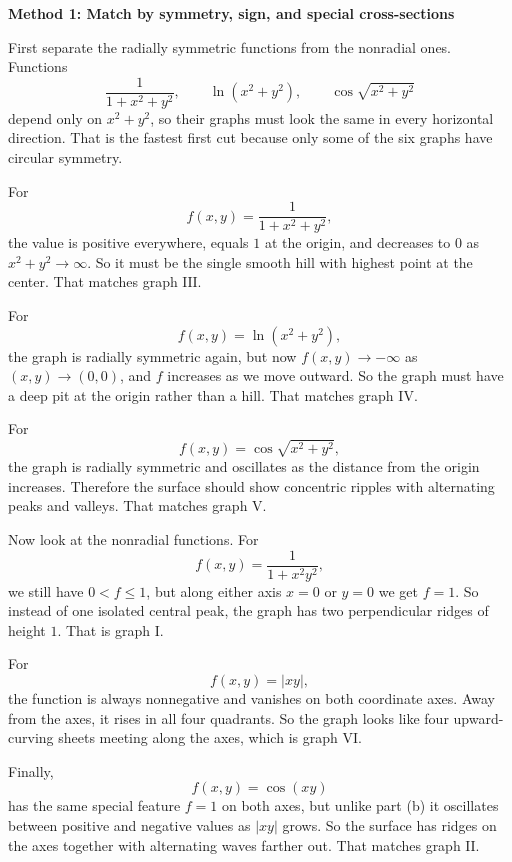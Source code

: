 \documentclass[a4paper,12pt,twocolumn]{article}
\newenvironment{solutionbox}{\begin{framed}}{\end{framed}}
\begin{document}
\begin{solutionbox}
\textbf{Method 1: Match by symmetry, sign, and special cross-sections}

\begin{steps}
\item First separate the radially symmetric functions from the nonradial ones. Functions
\[
\frac{1}{1+x^2+y^2},\qquad \ln(x^2+y^2),\qquad \cos\sqrt{x^2+y^2}
\]
depend only on \(x^2+y^2\), so their graphs must look the same in every horizontal direction. That is the fastest first cut because only some of the six graphs have circular symmetry.

\item For
\[
f(x,y)=\frac{1}{1+x^2+y^2},
\]
the value is positive everywhere, equals \(1\) at the origin, and decreases to \(0\) as \(x^2+y^2\to\infty\). So it must be the single smooth hill with highest point at the center. That matches graph \(\mathrm{III}\).

\item For
\[
f(x,y)=\ln(x^2+y^2),
\]
the graph is radially symmetric again, but now \(f(x,y)\to-\infty\) as \((x,y)\to(0,0)\), and \(f\) increases as we move outward. So the graph must have a deep pit at the origin rather than a hill. That matches graph \(\mathrm{IV}\).

\item For
\[
f(x,y)=\cos\sqrt{x^2+y^2},
\]
the graph is radially symmetric and oscillates as the distance from the origin increases. Therefore the surface should show concentric ripples with alternating peaks and valleys. That matches graph \(\mathrm{V}\).

\item Now look at the nonradial functions. For
\[
f(x,y)=\frac{1}{1+x^2y^2},
\]
we still have \(0<f\le 1\), but along either axis \(x=0\) or \(y=0\) we get \(f=1\). So instead of one isolated central peak, the graph has two perpendicular ridges of height \(1\). That is graph \(\mathrm{I}\).

\item For
\[
f(x,y)=|xy|,
\]
the function is always nonnegative and vanishes on both coordinate axes. Away from the axes, it rises in all four quadrants. So the graph looks like four upward-curving sheets meeting along the axes, which is graph \(\mathrm{VI}\).

\item Finally,
\[
f(x,y)=\cos(xy)
\]
has the same special feature \(f=1\) on both axes, but unlike part (b) it oscillates between positive and negative values as \(|xy|\) grows. So the surface has ridges on the axes together with alternating waves farther out. That matches graph \(\mathrm{II}\).
\end{steps}
\end{solutionbox}
\end{document}
